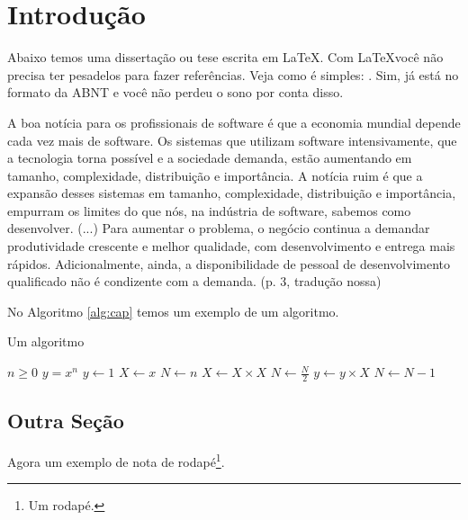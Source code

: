 \chapter{Introdução}

Abaixo temos uma dissertação ou tese escrita em \LaTeX.
Com \LaTeX você não precisa ter pesadelos para fazer referências. Veja como é simples: \cite{knuth1984tex}.
Sim, já está no formato da ABNT e você não perdeu o sono por conta disso.

\lipsum[2-4]

\begin{longcitation}
	A boa notícia para os profissionais de software é que a economia mundial depende cada vez mais de software. Os sistemas que utilizam software intensivamente, que a tecnologia torna possível e a sociedade demanda, estão aumentando em tamanho, complexidade, distribuição e importância. A notícia ruim é que a expansão desses sistemas em tamanho, complexidade, distribuição e importância, empurram os limites do que nós, na indústria de software, sabemos como desenvolver. (...) Para aumentar o problema, o negócio continua a demandar produtividade crescente e melhor qualidade, com desenvolvimento e entrega mais rápidos. Adicionalmente, ainda, a disponibilidade de pessoal de desenvolvimento qualificado não é condizente com a demanda. (p. 3, tradução nossa)
\end{longcitation}

\lipsum[2-4]
\lipsum[2-4]

No Algoritmo \ref{alg:cap} temos um exemplo de um algoritmo.

\begin{algorithm}
\caption{Um algoritmo}\label{alg:cap}
\begin{algorithmic}[1]
\Require $n \geq 0$
\Ensure $y = x^n$
\State $y \gets 1$
\State $X \gets x$
\State $N \gets n$
    \State $X \gets X \times X$
    \State $N \gets \frac{N}{2}$  
    \State $y \gets y \times X$
    \State $N \gets N - 1$
\EndIf
\EndWhile
\end{algorithmic}
\end{algorithm}

\section{Outra Seção}
\lipsum[2-4]

Agora um exemplo de nota de rodapé\footnote{Um rodapé.}.

